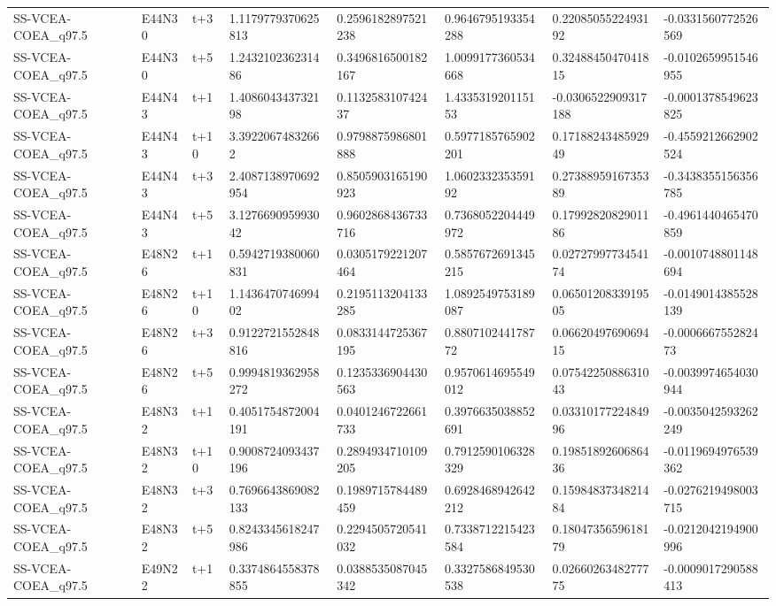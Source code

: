 \begin{landscape}
\begin{longtable}{llllllll}
SS-VCEA-COEA\_q97.5 & E44N30 & t+3 & 1.1179779370625813 & 0.2596182897521238 & 0.9646795193354288 & 0.2208505522493192 & -0.0331560772526569 \\
SS-VCEA-COEA\_q97.5 & E44N30 & t+5 & 1.243210236231486 & 0.3496816500182167 & 1.0099177360534668 & 0.3248845047041815 & -0.0102659951546955 \\
SS-VCEA-COEA\_q97.5 & E44N43 & t+1 & 1.408604343732198 & 0.113258310742437 & 1.433531920115153 & -0.0306522909317188 & -0.0001378549623825 \\
SS-VCEA-COEA\_q97.5 & E44N43 & t+10 & 3.39220674832662 & 0.9798875986801888 & 0.5977185765902201 & 0.1718824348592949 & -0.4559212662902524 \\
SS-VCEA-COEA\_q97.5 & E44N43 & t+3 & 2.4087138970692954 & 0.8505903165190923 & 1.060233235359192 & 0.2738895916735389 & -0.3438355156356785 \\
SS-VCEA-COEA\_q97.5 & E44N43 & t+5 & 3.127669095993042 & 0.9602868436733716 & 0.7368052204449972 & 0.1799282082901186 & -0.4961440465470859 \\
SS-VCEA-COEA\_q97.5 & E48N26 & t+1 & 0.5942719380060831 & 0.0305179221207464 & 0.5857672691345215 & 0.0272799773454174 & -0.0010748801148694 \\
SS-VCEA-COEA\_q97.5 & E48N26 & t+10 & 1.143647074699402 & 0.2195113204133285 & 1.0892549753189087 & 0.0650120833919505 & -0.0149014385528139 \\
SS-VCEA-COEA\_q97.5 & E48N26 & t+3 & 0.9122721552848816 & 0.0833144725367195 & 0.880710244178772 & 0.0662049769069415 & -0.000666755282473 \\
SS-VCEA-COEA\_q97.5 & E48N26 & t+5 & 0.9994819362958272 & 0.1235336904430563 & 0.9570614695549012 & 0.0754225088631043 & -0.0039974654030944 \\
SS-VCEA-COEA\_q97.5 & E48N32 & t+1 & 0.4051754872004191 & 0.0401246722661733 & 0.3976635038852691 & 0.0331017722484996 & -0.0035042593262249 \\
SS-VCEA-COEA\_q97.5 & E48N32 & t+10 & 0.9008724093437196 & 0.2894934710109205 & 0.7912590106328329 & 0.1985189260686436 & -0.0119694976539362 \\
SS-VCEA-COEA\_q97.5 & E48N32 & t+3 & 0.7696643869082133 & 0.1989715784489459 & 0.6928468942642212 & 0.1598483734821484 & -0.0276219498003715 \\
SS-VCEA-COEA\_q97.5 & E48N32 & t+5 & 0.8243345618247986 & 0.2294505720541032 & 0.7338712215423584 & 0.1804735659618179 & -0.0212042194900996 \\
SS-VCEA-COEA\_q97.5 & E49N22 & t+1 & 0.3374864558378855 & 0.0388535087045342 & 0.3327586849530538 & 0.0266026348277775 & -0.0009017290588413 \\

\end{longtable}
\end{landscape}
